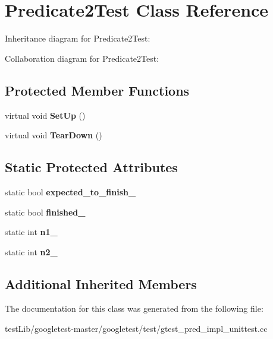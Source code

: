 \hypertarget{classPredicate2Test}{}\section{Predicate2\+Test Class Reference}
\label{classPredicate2Test}


Inheritance diagram for Predicate2\+Test\+:


Collaboration diagram for Predicate2\+Test\+:
\subsection*{Protected Member Functions}
\begin{DoxyCompactItemize}
\item 
\mbox{\label{classPredicate2Test_a9778563daf4846327d32061c1a8ccba0}} 
virtual void {\bfseries Set\+Up} ()
\item 
\mbox{\label{classPredicate2Test_a7379f8f7772af6b4c76edcc90b6aaaeb}} 
virtual void {\bfseries Tear\+Down} ()
\end{DoxyCompactItemize}
\subsection*{Static Protected Attributes}
\begin{DoxyCompactItemize}
\item 
\mbox{\label{classPredicate2Test_a56cf1f0f556addd9a62e0644dc1a86fc}} 
static bool {\bfseries expected\+\_\+to\+\_\+finish\+\_\+}
\item 
\mbox{\label{classPredicate2Test_a30f4ef76d3004253078e767e5c653b85}} 
static bool {\bfseries finished\+\_\+}
\item 
\mbox{\label{classPredicate2Test_ac002d8e279b24e75906fd19973fc2170}} 
static int {\bfseries n1\+\_\+}
\item 
\mbox{\label{classPredicate2Test_a9dbe5173570b9b911af2df889c287027}} 
static int {\bfseries n2\+\_\+}
\end{DoxyCompactItemize}
\subsection*{Additional Inherited Members}


The documentation for this class was generated from the following file\+:\begin{DoxyCompactItemize}
\item 
test\+Lib/googletest-\/master/googletest/test/gtest\+\_\+pred\+\_\+impl\+\_\+unittest.\+cc\end{DoxyCompactItemize}
